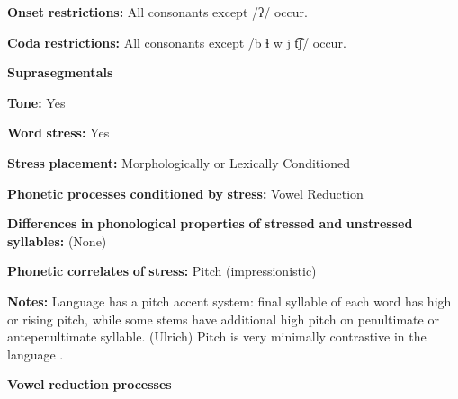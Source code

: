 \documentclass[output=paper]{langsci/langscibook}
\begin{document}
\begin{styleBody}
\textbf{Onset} \textbf{restrictions:} All consonants except /ʔ/ occur.
\end{styleBody}

\begin{styleBody}
\textbf{Coda} \textbf{restrictions:} All consonants except /b ɬ w j t͡ʃ/ occur.
\end{styleBody}

\begin{styleBody}
\textbf{Suprasegmentals}
\end{styleBody}

\begin{styleBody}
\textbf{Tone:} Yes
\end{styleBody}

\begin{styleBody}
\textbf{Word} \textbf{stress:} Yes
\end{styleBody}

\begin{styleBody}
\textbf{Stress} \textbf{placement:} Morphologically or Lexically Conditioned
\end{styleBody}

\begin{styleBody}
\textbf{Phonetic} \textbf{processes} \textbf{conditioned} \textbf{by} \textbf{stress:} Vowel Reduction
\end{styleBody}

\begin{styleBody}
\textbf{Differences} \textbf{in} \textbf{phonological} \textbf{properties} \textbf{of} \textbf{stressed} \textbf{and} \textbf{unstressed} \textbf{syllables:} (None)
\end{styleBody}

\begin{styleBody}
\textbf{Phonetic} \textbf{correlates} \textbf{of} \textbf{stress:} Pitch (impressionistic)
\end{styleBody}

\begin{styleBody}
\textbf{Notes:} Language has a pitch accent system: final syllable of each word has high or rising pitch, while some stems have additional high pitch on penultimate or antepenultimate syllable. (Ulrich) Pitch is very minimally contrastive in the language \citep[17]{Broadwell2006}.
\end{styleBody}

\begin{styleBody}
\textbf{Vowel} \textbf{reduction} \textbf{processes}
\end{styleBody}
\end{document}
